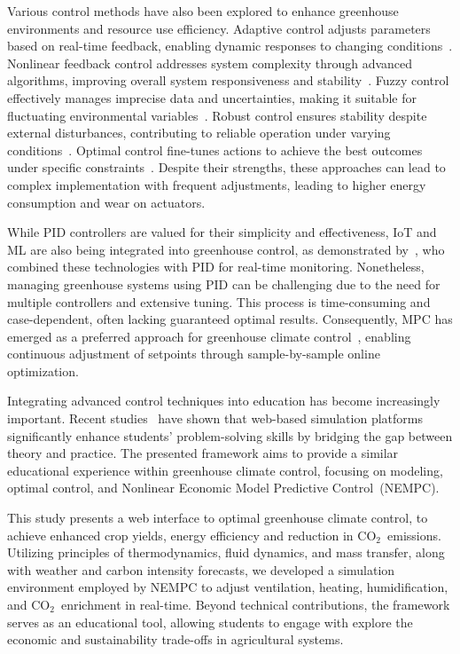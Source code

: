 \documentclass[conference]{IEEEtran}
\newcommand{\coo}{\ensuremath{\mathrm{CO_2}}}
\begin{document}
Various control methods have also been explored to enhance greenhouse environments and resource use efficiency. Adaptive control adjusts parameters based on real-time feedback, enabling dynamic responses to changing conditions~\cite{Tian2022}. Nonlinear feedback control addresses system complexity through advanced algorithms, improving overall system responsiveness and stability~\cite{Bood2023}. Fuzzy control effectively manages imprecise data and uncertainties, making it suitable for fluctuating environmental variables~\cite{smartcities7030055}. Robust control ensures stability despite external disturbances, contributing to reliable operation under varying conditions~\cite{Zhang2021}. Optimal control fine-tunes actions to achieve the best outcomes under specific constraints~\cite{Debroy2024, SVENSEN2024108578}. Despite their strengths, these approaches can lead to complex implementation with frequent adjustments, leading to higher energy consumption and wear on actuators.

While PID controllers are valued for their simplicity and effectiveness, IoT and ML are also being integrated into greenhouse control, as demonstrated by~\cite{Wang2024}, who combined these technologies with PID for real-time monitoring. Nonetheless, managing greenhouse systems using PID can be challenging due to the need for multiple controllers and extensive tuning. This process is time-consuming and case-dependent, often lacking guaranteed optimal results. Consequently, MPC has emerged as a preferred approach for greenhouse climate control~\cite{Hu2022}, enabling continuous adjustment of setpoints through sample-by-sample online optimization.

Integrating advanced control techniques into education has become increasingly important. Recent studies~\cite{WangEducation2024, Zakova2024} have shown that web-based simulation platforms significantly enhance students' problem-solving skills by bridging the gap between theory and practice. The presented framework aims to provide a similar educational experience within greenhouse climate control, focusing on modeling, optimal control, and Nonlinear Economic Model Predictive Control~(NEMPC).

This study presents a web interface to optimal greenhouse climate control, to achieve enhanced crop yields, energy efficiency and reduction in \coo\ emissions. Utilizing principles of thermodynamics, fluid dynamics, and mass transfer, along with weather and carbon intensity forecasts, we developed a simulation environment employed by NEMPC to adjust ventilation, heating, humidification, and \coo\ enrichment in real-time. Beyond technical contributions, the framework serves as an educational tool, allowing students to engage with explore the economic and sustainability trade-offs in agricultural systems.
\end{document}
